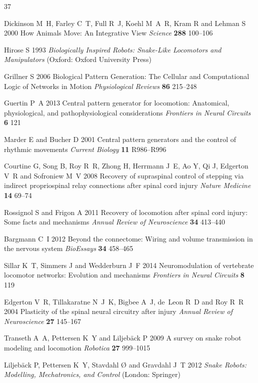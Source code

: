 \documentclass{iopjournal}
\begin{document}
\begin{thebibliography}{37}

Dickinson M~H, Farley C~T, Full R~J, Koehl M~A~R, Kram R and Lehman S 2000 How Animals Move: An Integrative View {\em Science\/} {\bf 288} 100--106

Hirose S 1993 {\em Biologically Inspired Robots: Snake-Like Locomotors and Manipulators\/} (Oxford: Oxford University Press)

Grillner S 2006 Biological Pattern Generation: The Cellular and Computational Logic of Networks in Motion {\em Physiological Reviews\/} {\bf 86} 215--248

Guertin P~A 2013 Central pattern generator for locomotion: Anatomical, physiological, and pathophysiological considerations {\em Frontiers in Neural Circuits\/} {\bf 6} 121

Marder E and Bucher D 2001 Central pattern generators and the control of rhythmic movements {\em Current Biology\/} {\bf 11} R986--R996

Courtine G, Song B, Roy R~R, Zhong H, Herrmann J~E, Ao Y, Qi J, Edgerton V~R and Sofroniew M~V 2008 Recovery of supraspinal control of stepping via indirect propriospinal relay connections after spinal cord injury {\em Nature Medicine\/} {\bf 14} 69--74

Rossignol S and Frigon A 2011 Recovery of locomotion after spinal cord injury: Some facts and mechanisms {\em Annual Review of Neuroscience\/} {\bf 34} 413--440

Bargmann C~I 2012 Beyond the connectome: Wiring and volume transmission in the nervous system {\em BioEssays\/} {\bf 34} 458--465

Sillar K~T, Simmers J and Wedderburn J~F 2014 Neuromodulation of vertebrate locomotor networks: Evolution and mechanisms {\em Frontiers in Neural Circuits\/} {\bf 8} 119

Edgerton V~R, Tillakaratne N~J~K, Bigbee A~J, de~Leon R~D and Roy R~R 2004 Plasticity of the spinal neural circuitry after injury {\em Annual Review of Neuroscience\/} {\bf 27} 145--167

Transeth A~A, Pettersen K~Y and Liljeb{\"a}ck P 2009 A survey on snake robot modeling and locomotion {\em Robotica\/} {\bf 27} 999--1015

Liljeb{\"a}ck P, Pettersen K~Y, Stavdahl {\O} and Gravdahl J~T 2012 {\em Snake Robots: Modelling, Mechatronics, and Control\/} (London: Springer)


\end{thebibliography}
\end{document}
